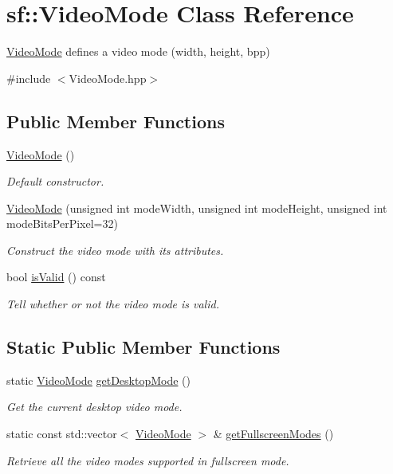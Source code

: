 \hypertarget{classsf_1_1_video_mode}{}\section{sf\+:\+:Video\+Mode Class Reference}
\label{classsf_1_1_video_mode}


\mbox{\hyperlink{classsf_1_1_video_mode}{Video\+Mode}} defines a video mode (width, height, bpp)  




{\ttfamily \#include $<$Video\+Mode.\+hpp$>$}

\subsection*{Public Member Functions}
\begin{DoxyCompactItemize}
\item 
\mbox{\hyperlink{classsf_1_1_video_mode_a04c9417e5c304510bef5f6aeb03f6ce1}{Video\+Mode}} ()
\begin{DoxyCompactList}\small\item\em Default constructor. \end{DoxyCompactList}\item 
\mbox{\hyperlink{classsf_1_1_video_mode_a46c35ed41de9e115661dcd529d64e9d3}{Video\+Mode}} (unsigned int mode\+Width, unsigned int mode\+Height, unsigned int mode\+Bits\+Per\+Pixel=32)
\begin{DoxyCompactList}\small\item\em Construct the video mode with its attributes. \end{DoxyCompactList}\item 
bool \mbox{\hyperlink{classsf_1_1_video_mode_ad5e04c044b0925523c75ecb173d2129a}{is\+Valid}} () const
\begin{DoxyCompactList}\small\item\em Tell whether or not the video mode is valid. \end{DoxyCompactList}\end{DoxyCompactItemize}
\subsection*{Static Public Member Functions}
\begin{DoxyCompactItemize}
\item 
static \mbox{\hyperlink{classsf_1_1_video_mode}{Video\+Mode}} \mbox{\hyperlink{classsf_1_1_video_mode_ac1be160a4342e6eafb2cb0e8c9b18d44}{get\+Desktop\+Mode}} ()
\begin{DoxyCompactList}\small\item\em Get the current desktop video mode. \end{DoxyCompactList}\item 
static const std\+::vector$<$ \mbox{\hyperlink{classsf_1_1_video_mode}{Video\+Mode}} $>$ \& \mbox{\hyperlink{classsf_1_1_video_mode_a6815b9b3b35767d5b4563fbed4bfc67b}{get\+Fullscreen\+Modes}} ()
\begin{DoxyCompactList}\small\item\em Retrieve all the video modes supported in fullscreen mode. \end{DoxyCompactList}\end{DoxyCompactItemize}
